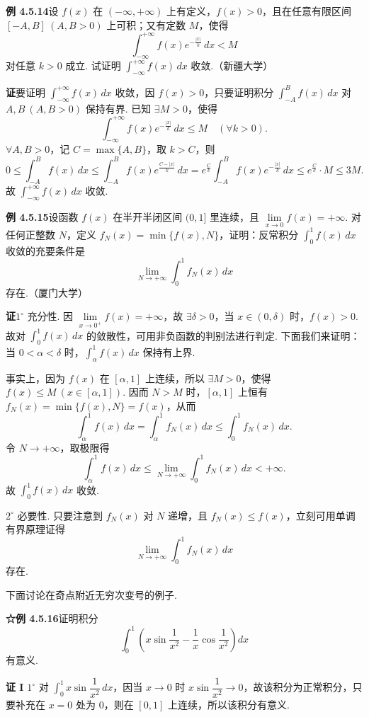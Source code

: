 \documentclass[UTF8,12pt,a4paper,fontset=fandol]{ctexart}
\begin{document}
\noindent\textbf{例 4.5.14}\quad 设 $f(x)$ 在 $(-\infty,+\infty)$ 上有定义，$f(x)>0$，且在任意有限区间 $[-A,B]\ (A,B>0)$ 上可积；又有定数 $M$，使得
\[
\int_{-\infty}^{+\infty}f(x)e^{-\frac{|x|}{k}}\,dx<M
\]
对任意 $k>0$ 成立. 试证明 $\displaystyle\int_{-\infty}^{+\infty}f(x)\,dx$ 收敛.（新疆大学）

\noindent\textbf{证}\quad 要证明 $\displaystyle\int_{-\infty}^{+\infty}f(x)\,dx$ 收敛，因 $f(x)>0$，只要证明积分 $\displaystyle\int_{-A}^B f(x)\,dx$ 对 $A,B\ (A,B>0)$ 保持有界. 已知 $\exists M>0$，使得
\[
\int_{-\infty}^{+\infty}f(x)e^{-\frac{|x|}{k}}\,dx\le M\quad(\forall k>0).
\]
$\forall A,B>0$，记 $C=\max\{A,B\}$，取 $k>C$，则
\[
0\le\int_{-A}^B f(x)\,dx
\le\int_{-A}^B f(x)e^{\frac{C-|x|}{k}}\,dx
=e^{\frac Ck}\int_{-A}^B f(x)e^{-\frac{|x|}{k}}\,dx
\le e^{\frac Ck}\cdot M\le3M.
\]
故 $\displaystyle\int_{-\infty}^{+\infty}f(x)\,dx$ 收敛.

\noindent\textbf{例 4.5.15}\quad 设函数 $f(x)$ 在半开半闭区间 $(0,1]$ 里连续，且 $\lim\limits_{x\to0}f(x)=+\infty$. 对任何正整数 $N$，定义 $f_N(x)=\min\{f(x),N\}$，证明：反常积分 $\displaystyle\int_0^1 f(x)\,dx$ 收敛的充要条件是
\[
\lim_{N\to+\infty}\int_0^1 f_N(x)\,dx
\]
存在.（厦门大学）

\noindent\textbf{证}\quad $1^\circ$ 充分性. 因 $\lim\limits_{x\to0^+}f(x)=+\infty$，故 $\exists\delta>0$，当 $x\in(0,\delta)$ 时，$f(x)>0$. 故对 $\displaystyle\int_0^1 f(x)\,dx$ 的敛散性，可用非负函数的判别法进行判定. 下面我们来证明：当 $0<\alpha<\delta$ 时，$\displaystyle\int_\alpha^1f(x)\,dx$ 保持有上界.

事实上，因为 $f(x)$ 在 $[\alpha,1]$ 上连续，所以 $\exists M>0$，使得 $f(x)\le M\ (x\in[\alpha,1])$. 因而 $N>M$ 时，$[\alpha,1]$ 上恒有 $f_N(x)=\min\{f(x),N\}=f(x)$，从而
\[
\int_\alpha^1 f(x)\,dx=\int_\alpha^1 f_N(x)\,dx
\le\int_0^1 f_N(x)\,dx.
\]
令 $N\to+\infty$，取极限得
\[
\int_\alpha^1 f(x)\,dx
\le\lim_{N\to+\infty}\int_0^1 f_N(x)\,dx<+\infty.
\]
故 $\displaystyle\int_0^1 f(x)\,dx$ 收敛.

$2^\circ$ 必要性. 只要注意到 $f_N(x)$ 对 $N$ 递增，且 $f_N(x)\le f(x)$，立刻可用单调有界原理证得
\[
\lim_{N\to+\infty}\int_0^1 f_N(x)\,dx
\]
存在.

下面讨论在奇点附近无穷次变号的例子.

\noindent\textbf{☆例 4.5.16}\quad 证明积分
\[
\int_0^1\left(x\sin\frac1{x^2}-\frac1x\cos\frac1{x^2}\right)dx
\]
有意义.

\noindent\textbf{证 I}\quad
$1^\circ$ 对 $\displaystyle\int_0^1x\sin\dfrac1{x^2}\,dx$，因当 $x\to0$ 时 $x\sin\dfrac1{x^2}\to0$，故该积分为正常积分，只要补充在 $x=0$ 处为 0，则在 $[0,1]$ 上连续，所以该积分有意义.
\end{document}
